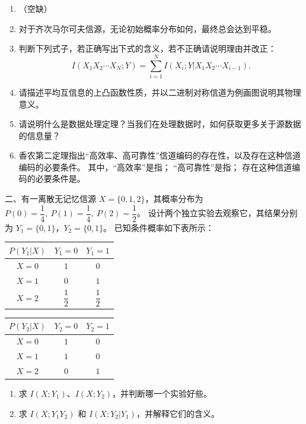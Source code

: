 \documentclass[UTF8,a4paper,12pt]{ctexart}
\newcommand{\blank}[1][3cm]{\underline{\hspace{#1}}}
\begin{document}
\begin{enumerate}[label=\arabic*., leftmargin=2em, itemsep=7em]

\item （空缺）

\item 对于齐次马尔可夫信源，无论初始概率分布如何，最终总会达到平稳。

\item 判断下列式子，若正确写出下式的含义，若不正确请说明理由并改正：
\[
I(X_1X_2\cdots X_N;Y)
=\sum_{i=1}^{N} I(X_i;Y|X_1X_2\cdots X_{i-1}).
\]

\item 请描述平均互信息的上凸函数性质，并以二进制对称信道为例画图说明其物理意义。

\item 请说明什么是数据处理定理？当我们在处理数据时，如何获取更多关于源数据的信息量？

\item 香农第二定理指出“高效率、高可靠性”信道编码的存在性，以及存在这种信道编码的必要条件。
其中，“高效率”是指\blank[4cm]；
“高可靠性”是指\blank[4cm]；
存在这种信道编码的必要条件是\blank[5cm]。

\end{enumerate}

\vspace{1em}

\noindent
{\heiti 二、}有一离散无记忆信源 $X=\{0,1,2\}$，其概率分布为
$P(0)=\dfrac14,\ P(1)=\dfrac14,\ P(2)=\dfrac12$。
设计两个独立实验去观察它，其结果分别为 $Y_1=\{0,1\}$，$Y_2=\{0,1\}$。
已知条件概率如下表所示：

\begin{center}
\renewcommand{\arraystretch}{1.35}
\begin{tabular}{c|cc}
$P(Y_1|X)$ & $Y_1=0$ & $Y_1=1$\\
\hline
$X=0$ & $1$ & $0$\\
$X=1$ & $0$ & $1$\\
$X=2$ & $\dfrac12$ & $\dfrac12$
\end{tabular}
\qquad
\begin{tabular}{c|cc}
$P(Y_2|X)$ & $Y_2=0$ & $Y_2=1$\\
\hline
$X=0$ & $1$ & $0$\\
$X=1$ & $1$ & $0$\\
$X=2$ & $0$ & $1$
\end{tabular}
\end{center}

\begin{enumerate}[label=\arabic*., leftmargin=2em, itemsep=0.8em]
\item 求 $I(X;Y_1)$、$I(X;Y_2)$，并判断哪一个实验好些。
\item 求 $I(X;Y_1Y_2)$ 和 $I(X;Y_2|Y_1)$，并解释它们的含义。
\end{enumerate}
\end{document}
